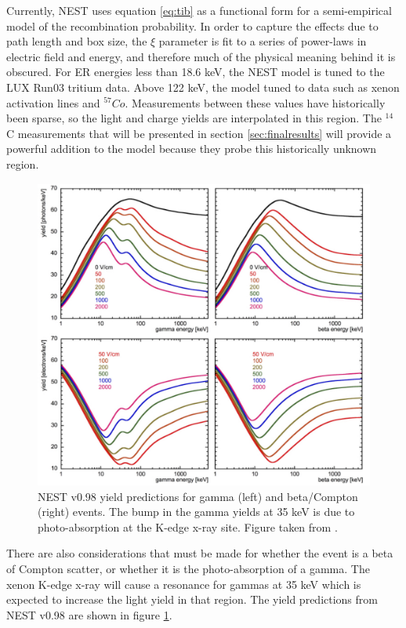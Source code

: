 Currently, NEST uses equation \ref{eq:tib} as a functional form for a semi-empirical model of the recombination probability. In order to capture the effects due to path length and box size, the $\xi$ parameter is fit to a series of power-laws in electric field and energy, and therefore much of the physical meaning behind it is obscured. For ER energies less than 18.6 keV, the NEST model is tuned to the LUX Run03 tritium data\cite{lux_tritium}. Above 122 keV, the model tuned to data such as xenon activation lines and $^{57}Co$. Measurements between these values have historically been sparse, so the light and charge yields are interpolated in this region. The $^{14}$C measurements that will be presented in section \ref{sec:finalresults} will provide a powerful addition to the model because they probe this historically unknown region.

\begin{figure}[!h]
\includegraphics[width=\linewidth]{Figures/nest_yields0p98.pdf}
\caption{NEST v0.98 yield predictions for gamma (left) and beta/Compton (right) events. The bump in the gamma yields at 35 keV is due to photo-absorption at the K-edge x-ray site. Figure taken from \cite{nest2}.}
\label{fig:nest_yields0p98} 
\end{figure}


There are also considerations that must be made for whether the event is a beta of Compton scatter, or whether it is the photo-absorption of a gamma. The xenon K-edge x-ray will cause a resonance for gammas at 35 keV which is expected to increase the light yield in that region. The yield predictions from NEST v0.98 are shown in figure \ref{fig:nest_yields0p98}.

